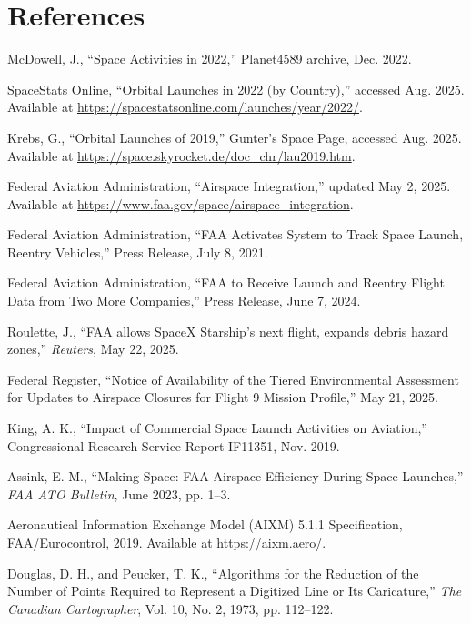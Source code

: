\documentclass[journal]{new-aiaa}
\begin{document}
\section*{References}
\begin{thebibliography}{99}

 McDowell, J., “Space Activities in 2022,” Planet4589 archive, Dec. 2022.

 SpaceStats Online, “Orbital Launches in 2022 (by Country),” accessed Aug. 2025. Available at \url{https://spacestatsonline.com/launches/year/2022/}.

 Krebs, G., “Orbital Launches of 2019,” Gunter’s Space Page, accessed Aug. 2025. Available at \url{https://space.skyrocket.de/doc_chr/lau2019.htm}.

 Federal Aviation Administration, “Airspace Integration,” updated May 2, 2025. Available at \url{https://www.faa.gov/space/airspace_integration}.

 Federal Aviation Administration, “FAA Activates System to Track Space Launch, Reentry Vehicles,” Press Release, July 8, 2021.

 Federal Aviation Administration, “FAA to Receive Launch and Reentry Flight Data from Two More Companies,” Press Release, June 7, 2024.

 Roulette, J., “FAA allows SpaceX Starship’s next flight, expands debris hazard zones,” \textit{Reuters}, May 22, 2025.

 Federal Register, “Notice of Availability of the Tiered Environmental Assessment for Updates to Airspace Closures for Flight 9 Mission Profile,” May 21, 2025.

 King, A. K., “Impact of Commercial Space Launch Activities on Aviation,” Congressional Research Service Report IF11351, Nov. 2019.

 Assink, E. M., “Making Space: FAA Airspace Efficiency During Space Launches,” \textit{FAA ATO Bulletin}, June 2023, pp. 1--3.

 Aeronautical Information Exchange Model (AIXM) 5.1.1 Specification, FAA/Eurocontrol, 2019. Available at \url{https://aixm.aero/}.

 Douglas, D. H., and Peucker, T. K., “Algorithms for the Reduction of the Number of Points Required to Represent a Digitized Line or Its Caricature,” \textit{The Canadian Cartographer}, Vol. 10, No. 2, 1973, pp. 112--122.


\end{thebibliography}
\end{document}
